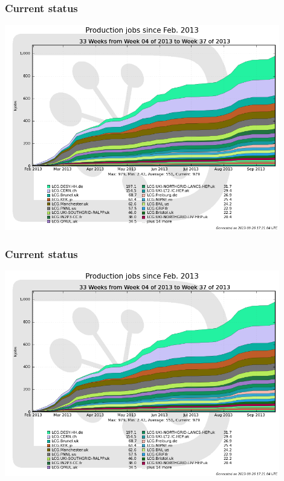 \documentclass[10pt,table,dvipsnames]{beamer}
\begin{document}
\begin{frame} 
\frametitle{Current status}
\centering
\includegraphics[width=0.9\textwidth]{prodjobs}
\end{frame}

\begin{frame} 
\frametitle{Current status}
\centering
\includegraphics[width=0.9\textwidth]{prodjobs}
\end{frame} 
\end{document}
